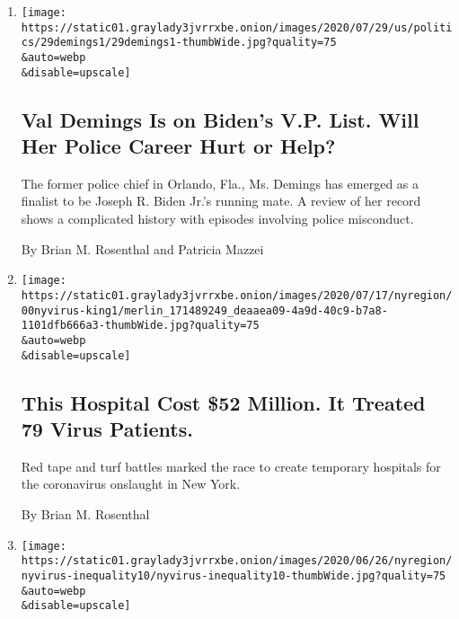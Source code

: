\begin{enumerate}
\def\labelenumi{\arabic{enumi}.}
\item
  \href{/article/val-demings-biden-vp.html}{}

  \texttt{[image: https://static01.graylady3jvrrxbe.onion/images/2020/07/29/us/politics/29demings1/29demings1-thumbWide.jpg?quality=75\\\&auto=webp\\\&disable=upscale]}

  \hypertarget{val-demings-is-on-bidens-vp-list-will-her-police-career-hurt-or-help}{%
  \subsection{Val Demings Is on Biden's V.P. List. Will Her Police
  Career Hurt or
  Help?}\label{val-demings-is-on-bidens-vp-list-will-her-police-career-hurt-or-help}}

  The former police chief in Orlando, Fla., Ms. Demings has emerged as a
  finalist to be Joseph R. Biden Jr.'s running mate. A review of her
  record shows a complicated history with episodes involving police
  misconduct.

  By Brian M. Rosenthal and Patricia Mazzei
\item
  \href{/2020/07/21/nyregion/coronavirus-hospital-usta-queens.html}{}

  \texttt{[image: https://static01.graylady3jvrrxbe.onion/images/2020/07/17/nyregion/00nyvirus-king1/merlin\_171489249\_deaaea09-4a9d-40c9-b7a8-1101dfb666a3-thumbWide.jpg?quality=75\\\&auto=webp\\\&disable=upscale]}

  \hypertarget{this-hospital-cost-52-million-it-treated-79-virus-patients}{%
  \subsection{This Hospital Cost \$52 Million. It Treated 79 Virus
  Patients.}\label{this-hospital-cost-52-million-it-treated-79-virus-patients}}

  Red tape and turf battles marked the race to create temporary
  hospitals for the coronavirus onslaught in New York.

  By Brian M. Rosenthal
\item
  \href{/2020/07/01/nyregion/Coronavirus-hospitals.html}{}

  \texttt{[image: https://static01.graylady3jvrrxbe.onion/images/2020/06/26/nyregion/nyvirus-inequality10/nyvirus-inequality10-thumbWide.jpg?quality=75\\\&auto=webp\\\&disable=upscale]}

  \hypertarget{why-surviving-the-virus-might-come-down-to-which-hospital-admits-you}{%
}
\end{enumerate}
